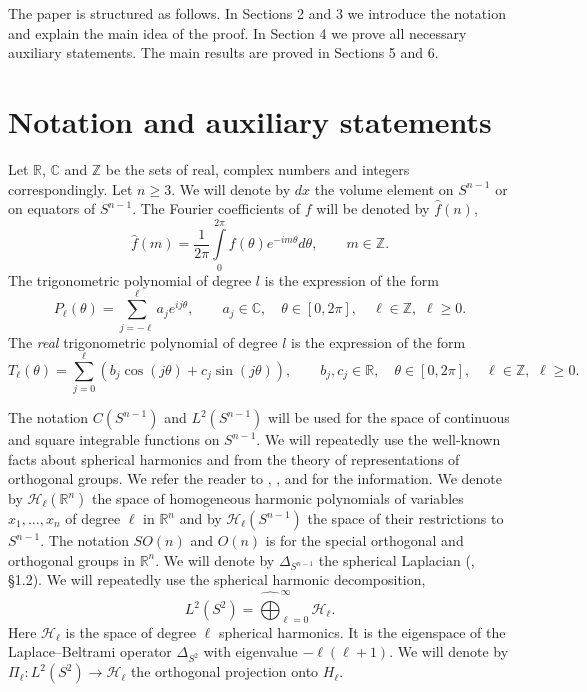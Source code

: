 \documentclass[11pt]{article}
\theoremstyle{definition}
\newcommand{\R}{\mathbb{R}}
\newcommand{\HH}{\mathcal H}
\begin{document}
The paper is structured as follows. In Sections 2 and 3 we introduce the notation and explain the main idea of the proof. In Section 4 we prove all necessary auxiliary statements. The main results are proved  in Sections 5 and 6.


\section{Notation and auxiliary statements}

Let ${\mathbb R}$, ${\mathbb C}$ and ${\mathbb Z}$ be the sets of real, complex numbers and  integers correspondingly. 
Let $n\ge 3$. We will denote  by $dx$ the volume element on $S^{n-1}$ or on equators of $S^{n-1}$. The Fourier coefficients of $f$ will be denoted by $\widehat{f}(n)$,
$$
\widehat{f}(m)=\frac{1}{2\pi}\int\limits_0^{2\pi}f(\theta)e^{-im\theta}d\theta,\qquad m\in {\mathbb Z}.
$$
The trigonometric polynomial of degree $l$ is the expression of the form
$$
P_\ell(\theta)=\sum\limits_{j=-\ell}^\ell a_je^{ij\theta}, \qquad a_j\in {\mathbb C},\quad \theta\in [0,2\pi],\quad \ell\in {\mathbb Z}, \,\,\ell\ge 0.
$$
The {\it real } trigonometric polynomial of degree $l$ is the expression of the form
$$
T_\ell(\theta)=\sum\limits_{j=0}^\ell (b_j\cos (j\theta)+c_j\sin(j\theta)), \qquad b_j, c_j\in {\mathbb R},\quad \theta\in [0,2\pi],\quad \ell\in {\mathbb Z}, \,\,\ell\ge 0.
$$

The notation \(C(S^{n-1})\) and \(L^2(S^{n-1})\) will be used for the space of continuous and square integrable functions on $S^{n-1}$.
We will repeatedly use the well-known facts about spherical harmonics and from the theory of representations of orthogonal groups. We refer the reader to \cite{BR}, \cite{GMS}, \cite{Sch2} and \cite{V} for the information.
We denote by
$\HH_\ell(\R^n)$
the space  of homogeneous harmonic polynomials of variables $x_1,\dots, x_n$
of degree \(\ell\) in \(\R^n\) and by $\HH_\ell(S^{n-1})$ the space of their restrictions to $S^{n-1}$.
The notation $SO(n)$ and $O(n)$ is for the special orthogonal and orthogonal groups in ${\mathbb R^n}$. 
We will denote  by  $\Delta_{S^{n-1}}$ the spherical Laplacian (\cite{Gro}, \S 1.2).
We will repeatedly use the spherical harmonic decomposition, 
\[
L^2(S^2)=\widehat{\bigoplus}_{\ell=0}^\infty \mathcal H_\ell.
\]
 Here \(\mathcal H_\ell\) is the space of degree
\(\ell\) spherical harmonics. It is the eigenspace of the Laplace--Beltrami operator
\(\Delta_{S^2}\) with eigenvalue
$-\ell(\ell+1)$. We will denote by 
$
\Pi_\ell:L^2(S^2)\to \mathcal H_\ell
$
 the orthogonal projection onto $H_\ell$.
\end{document}
